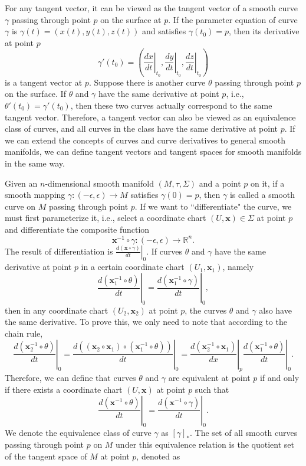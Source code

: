 \documentclass{report}
\begin{document}
For any tangent vector, it can be viewed as the tangent vector of a smooth curve $\gamma$ passing through point $p$ on the surface at $p$. If the parameter equation of curve $\gamma$ is $\gamma(t)=(x(t),y(t),z(t))$ and satisfies $\gamma(t_0)=p$, then its derivative at point $p$
\[
    \gamma'(t_0)=\left(\left.\frac{dx}{dt}\right|_{t_0},\left.\frac{dy}{dt}\right|_{t_0}, \left.\frac{dz}{dt}\right|_{t_0}\right)
\]
is a tangent vector at $p$. Suppose there is another curve $\theta$ passing through point $p$ on the surface. If $\theta$ and $\gamma$ have the same derivative at point $p$, i.e., $\theta'(t_0)=\gamma'(t_0)$, then these two curves actually correspond to the same tangent vector. Therefore, a tangent vector can also be viewed as an equivalence class of curves, and all curves in the class have the same derivative at point $p$. If we can extend the concepts of curves and curve derivatives to general smooth manifolds, we can define tangent vectors and tangent spaces for smooth manifolds in the same way.

Given an $n$-dimensional smooth manifold $(M,\tau,\Sigma)$ and a point $p$ on it, if a smooth mapping $\gamma:(-\epsilon,\epsilon)\to M$ satisfies $\gamma(0)=p$, then $\gamma$ is called a smooth curve on $M$ passing through point $p$. If we want to ``differentiate" the curve, we must first parameterize it, i.e., select a coordinate chart $(U,\mathbf{x})\in\Sigma$ at point $p$ and differentiate the composite function
\[
    \mathbf{x}^{-1} \circ \gamma:(-\epsilon,\epsilon)\to \mathbb{R}^n.
\]
The result of differentiation is $\left.\frac{d(\mathbf{x} \circ \gamma)}{dt}\right|_0$. If curves $\theta$ and $\gamma$ have the same derivative at point $p$ in a certain coordinate chart $(U_1,\mathbf{x}_1)$, namely
\[
    \left.\frac{d(\mathbf{x}_1^{-1} \circ \theta)}{dt}\right|_0=\left.\frac{d(\mathbf{x}_1^{-1} \circ \gamma)}{dt}\right|_0,
\]
then in any coordinate chart $(U_2,\mathbf{x}_2)$ at point $p$, the curves $\theta$ and $\gamma$ also have the same derivative. To prove this, we only need to note that according to the chain rule,
\[
    \left.\frac{d(\mathbf{x}_2^{-1} \circ \theta)}{dt}\right|_0=\left.\frac{d((\mathbf{x}_2 \circ \mathbf{x}_1)\circ(\mathbf{x}_1^{-1} \circ \theta))}{dt}\right|_0=\left.\frac{d(\mathbf{x}_2^{-1} \circ \mathbf{x}_1)}{dx}\right|_p\left.\frac{d(\mathbf{x}_1^{-1} \circ \theta)}{dt}\right|_0.
\]
Therefore, we can define that curves $\theta$ and $\gamma$ are equivalent at point $p$ if and only if there exists a coordinate chart $(U,\mathbf{x})$ at point $p$ such that
\[
    \left.\frac{d(\mathbf{x}^{-1} \circ \theta)}{dt}\right|_0=\left.\frac{d(\mathbf{x}^{-1} \circ \gamma)}{dt}\right|_0.
\]
We denote the equivalence class of curve $\gamma$ as $[\gamma]_*$. The set of all smooth curves passing through point $p$ on $M$ under this equivalence relation is the quotient set of the tangent space of $M$ at point $p$, denoted as
\end{document}
